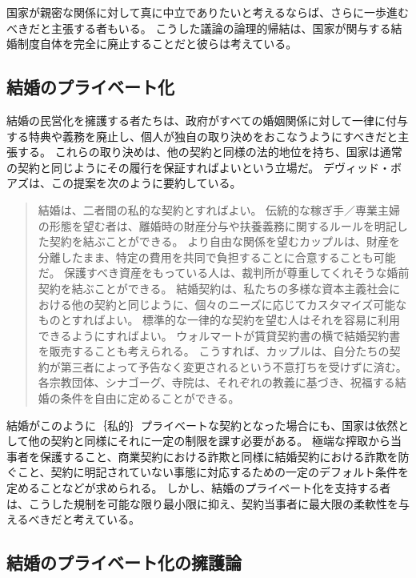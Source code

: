 \documentclass[paper=a4,book,openany]{jlreq}
\begin{document}
国家が親密な関係に対して真に中立でありたいと考えるならば、さらに一歩進むべきだと主張する者もいる。
こうした議論の論理的帰結は、国家が関与する結婚制度自体を完全に廃止することだと彼らは考えている。

\subsection{結婚のプライベート化}

結婚の民営化を擁護する者たちは、政府がすべての婚姻関係に対して一律に付与する特典や義務を廃止し、個人が独自の取り決めをおこなうようにすべきだと主張する。
これらの取り決めは、他の契約と同様の法的地位を持ち、国家は通常の契約と同じようにその履行を保証すればよいという立場だ。
デヴィッド・ボアズは、この提案を次のように要約している。

\begin{quote}
結婚は、二者間の私的な契約とすればよい。
伝統的な稼ぎ手／専業主婦の形態を望む者は、離婚時の財産分与や扶養義務に関するルールを明記した契約を結ぶことができる。
より自由な関係を望むカップルは、財産を分離したまま、特定の費用を共同で負担することに合意することも可能だ。
保護すべき資産をもっている人は、裁判所が尊重してくれそうな婚前契約を結ぶことができる。
結婚契約は、私たちの多様な資本主義社会における他の契約と同じように、個々のニーズに応じてカスタマイズ可能なものとすればよい。
標準的な一律的な契約を望む人はそれを容易に利用できるようにすればよい。
ウォルマートが賃貸契約書の横で結婚契約書を販売することも考えられる。
こうすれば、カップルは、自分たちの契約が第三者によって予告なく変更されるという不意打ちを受けずに済む。
各宗教団体、シナゴーグ、寺院は、それぞれの教義に基づき、祝福する結婚の条件を自由に定めることができる。
\citep{boaz97:_privat_marriag}

\end{quote}

結婚がこのように｛私的｝{プライベート}な契約となった場合にも、国家は依然として他の契約と同様にそれに一定の制限を課す必要がある。
極端な搾取から当事者を保護すること、商業契約における詐欺と同様に結婚契約における詐欺を防ぐこと、契約に明記されていない事態に対応するための一定のデフォルト条件を定めることなどが求められる。
しかし、結婚のプライベート化を支持する者は、こうした規制を可能な限り最小限に抑え、契約当事者に最大限の柔軟性を与えるべきだと考えている。

\subsection{結婚のプライベート化の擁護論}
\end{document}
